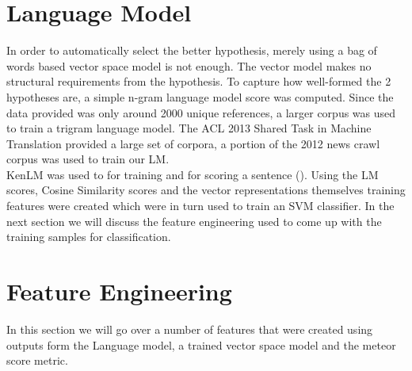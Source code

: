 \documentclass[11pt]{article}
\begin{document}
 \section{Language Model}
 In order to automatically select the better hypothesis, merely using a bag of
 words based vector space model is not enough. The vector model makes no
 structural requirements from the hypothesis. To capture how well-formed the
 2 hypotheses are, a simple n-gram language model score was computed. Since the
 data provided was only around 2000 unique references, a larger corpus was used
 to train a trigram language model. The ACL 2013 Shared Task in Machine
 Translation provided a large set of corpora, a portion of the 2012 news crawl
 corpus was used to train our LM.\\
  KenLM was used to for training and for
 scoring a sentence (\cite{heafield2011kenlm}). Using the LM scores, Cosine Similarity
 scores and the vector representations themselves training features were created
 which were in turn used to train an SVM classifier. In the next section we will
 discuss the feature engineering used to come up with the training samples for
 classification.
 \section{Feature Engineering}
In this section we will go over a number of features that were created using
outputs form the Language model, a trained vector space model and the meteor
score metric.
\end{document}
